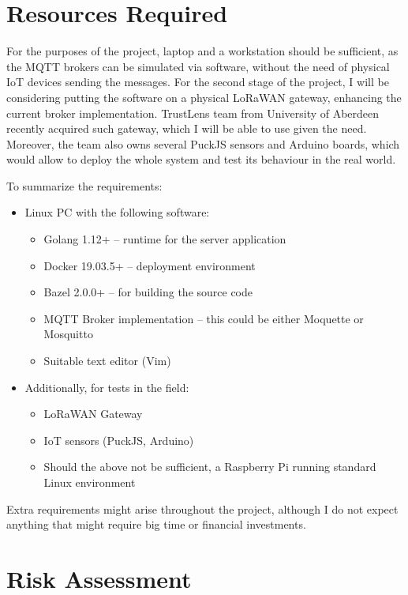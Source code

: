 \documentclass[a4paper,12pt]{article}
\begin{document}
\section*{Resources Required}

For the purposes of the project, laptop and a workstation should be sufficient, as the MQTT brokers can be simulated via software, without the need of physical IoT devices sending the messages. For the second stage of the project, I will be considering putting the software on a physical LoRaWAN gateway, enhancing the current broker implementation. TrustLens team from University of Aberdeen recently acquired such gateway, which I will be able to use given the need. Moreover, the team also owns several PuckJS sensors and Arduino boards, which would allow to deploy the whole system and test its behaviour in the real world.

To summarize the requirements:
\begin{itemize}
  \item Linux PC with the following software: 
    \begin{itemize}
      \item Golang 1.12+ -- runtime for the server application
      \item Docker 19.03.5+ -- deployment environment
      \item Bazel 2.0.0+ -- for building the source code
      \item MQTT Broker implementation -- this could be either Moquette or Mosquitto
      \item Suitable text editor (Vim)
    \end{itemize}
  \item Additionally, for tests in the field:
    \begin{itemize}
      \item LoRaWAN Gateway
      \item IoT sensors (PuckJS, Arduino) 
      \item Should the above not be sufficient, a Raspberry Pi running standard Linux environment
    \end{itemize}
\end{itemize}

Extra requirements might arise throughout the project, although I do not expect anything that might require big time or financial investments.

\section*{Risk Assessment}
\end{document}
